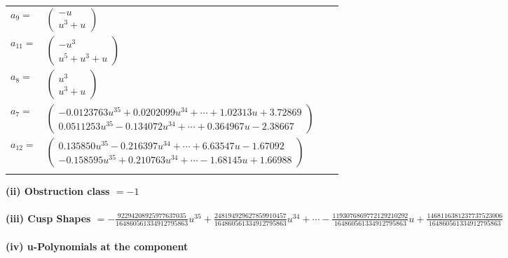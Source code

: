 \documentclass[1p]{elsarticle_modified}
\theoremstyle{definition}
\begin{document}
\begin{tabular}{m{7pt} m{180pt} m{7pt} m{180pt} }
\flushright $a_{9}=$&$\begin{pmatrix}- u\\u^3+u\end{pmatrix}$ \\
\flushright $a_{11}=$&$\begin{pmatrix}- u^3\\u^5+u^3+u\end{pmatrix}$ \\
\flushright $a_{8}=$&$\begin{pmatrix}u^3\\u^3+u\end{pmatrix}$ \\
\flushright $a_{7}=$&$\begin{pmatrix}-0.0123763 u^{35}+0.0202099 u^{34}+\cdots+1.02313 u+3.72869\\0.0511253 u^{35}-0.134072 u^{34}+\cdots+0.364967 u-2.38667\end{pmatrix}$ \\
\flushright $a_{12}=$&$\begin{pmatrix}0.135850 u^{35}-0.216397 u^{34}+\cdots+6.63547 u-1.67092\\-0.158595 u^{35}+0.210763 u^{34}+\cdots-1.68145 u+1.66988\end{pmatrix}$\\&\end{tabular}
\flushleft \textbf{(ii) Obstruction class $= -1$}\\~\\
\flushleft \textbf{(iii) Cusp Shapes $= -\frac{92294208925977637035}{164860561334912795863} u^{35}+\frac{248194929627859910457}{164860561334912795863} u^{34}+\cdots-\frac{1193076869772129210292}{164860561334912795863} u+\frac{1468116381237737523006}{164860561334912795863}$}\\~\\
\newpage\renewcommand{\arraystretch}{1}
\flushleft \textbf{(iv) u-Polynomials at the component}\newline \\
\end{document}
